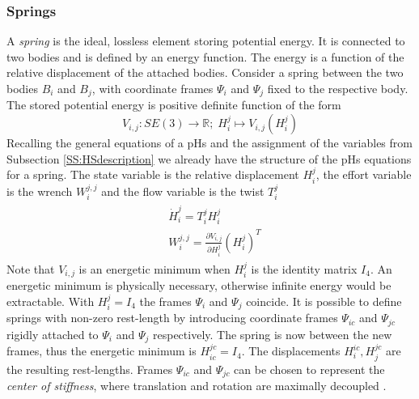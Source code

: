\documentclass[a4paper,twoside, openright,12pt]{report}
\begin{document}
\subsubsection{Springs}
A \emph{spring} is the ideal, lossless element storing potential energy. It is connected to two bodies and is defined by an energy function. The energy is a function of the relative displacement of the attached bodies. Consider a spring between the two bodies $ B_i $ and $ B_j $,  with coordinate frames $ \Psi_i $ and $ \Psi_j $ fixed to the respective body. The stored potential energy is positive definite function of the form \cite{Stramigioli_99}
\begin{equation}
	V_{i,j} : SE(3) \rightarrow \mathbb{R}; \; H_i^j \mapsto V_{i,j}(H_i^j)
\end{equation}
Recalling the general equations of a pHs and the assignment of the variables from Subsection \ref{SS:HSdescription} we already have the structure of the pHs equations for a spring. The state variable is the relative displacement $H_i^j$, the effort variable is the wrench $ W_i^{j,j} $ and the flow variable is the twist $T_i^j$
\begin{eqnarray}
\begin{aligned}
	&\dot{H}_i^j = T_i^{j}H_i^j\\
	&W_i^{j,j} = \frac{\partial V_{i,j}}{\partial H_i^j}(H_i^j)^T
\end{aligned}
\end{eqnarray}
Note that $ V_{i,j} $ is an energetic minimum when $ H_i^j $ is the identity matrix $I_4$. An energetic minimum is physically necessary, otherwise infinite energy would be extractable. With $ H_i^j = I_4 $ the frames $ \Psi_i $ and $\Psi_j$ coincide.
It is possible to define springs with non-zero rest-length by introducing coordinate frames $ \Psi_{ic} $ and $\Psi_{jc}$ rigidly attached to $ \Psi_i $ and $\Psi_j$ respectively. The spring is now between the new frames, thus the energetic minimum is $H_{ic}^{jc} = I_4$. The displacements $ H_i^{ic}, H_j^{jc} $ are the resulting rest-lengths. Frames $ \Psi_{ic} $ and $\Psi_{jc}$ can be chosen to represent the \emph{center of stiffness}, where translation and rotation are maximally decoupled \cite{Stramigioli_99}.
\end{document}
